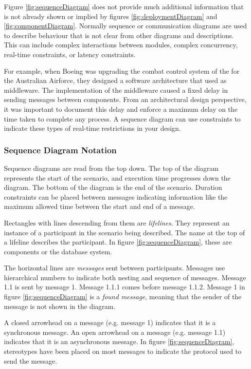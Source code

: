 Figure \ref{fig:sequenceDiagram} does not provide much additional information that is not already shown or implied by
figures \ref{fig:deploymentDiagram} and \ref{fig:componentDiagram}.
Normally sequence or communication diagrams are used to describe behaviour that is not clear from other diagrams and descriptions.
This can include complex interactions between modules, complex concurrency, real-time constraints, or latency constraints.

\noindent
For example, when Boeing was upgrading the combat control system of the 
for the Australian Airforce, they designed a software architecture that used
 as middleware.
The implementation of the middleware caused a fixed delay in sending messages between components.
From an architectural design perspective, it was important to document this delay and enforce a maximum delay on the time taken to complete any process.
A sequence diagram can use constraints to indicate these types of real-time restrictions in your design.

\subsubsection{Sequence Diagram Notation}\label{sec:sequenceNotation}
Sequence diagrams are read from the top down.
The top of the diagram represents the start of the scenario, and execution time progresses down the diagram.
The bottom of the diagram is the end of the scenario.
Duration constraints can be placed between messages indicating information like the maximum allowed time between the start and end of a message.

Rectangles with lines descending from them are \emph{lifelines}.
They represent an instance of a participant in the scenario being described.
The name at the top of a lifeline describes the participant.
In figure \ref{fig:sequenceDiagram}, these are components or the database system.

The horizontal lines are \emph{messages} sent between participants.
Messages use hierarchical numbers to indicate both nesting and sequence of messages.
Message 1.1 is sent by message 1. Message 1.1.1 comes before message 1.1.2.
Message 1 in figure \ref{fig:sequenceDiagram} is a \emph{found message}, meaning that the sender of the message is not shown in the diagram.

A closed arrowhead on a message (e.g. message 1) indicates that it is a synchronous message.
An open arrowhead on a message (e.g. message 1.1) indicates that it is an asynchronous message.
In figure \ref{fig:sequenceDiagram}, stereotypes have been placed on most messages to indicate the protocol used to send the message.

